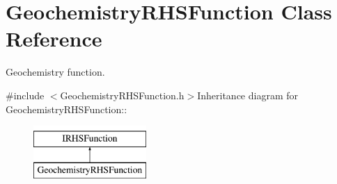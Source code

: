 \hypertarget{classGeochemistryRHSFunction}{
\section{GeochemistryRHSFunction Class Reference}
\label{classGeochemistryRHSFunction}
}


Geochemistry function.  


{\ttfamily \#include $<$GeochemistryRHSFunction.h$>$}Inheritance diagram for GeochemistryRHSFunction::\begin{figure}[H]
\begin{center}
\leavevmode
\includegraphics[height=2cm]{classGeochemistryRHSFunction}
\end{center}
\end{figure}

